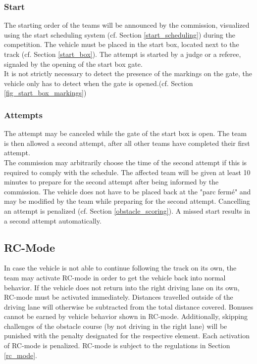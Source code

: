 \subsubsection{Start}

The starting order of the teams will be announced by the commission, visualized
using the start scheduling system (cf. Section \ref{start_scheduling}) during
the competition. The vehicle must be placed in the start box, located next to
the track (cf. Section \ref{start_box}). The attempt is started by a judge or a
referee, signaled by the opening of the start box gate.\\ It is not strictly
necessary to detect the presence of the markings on the gate, the vehicle only
has to detect when the gate is opened.(cf. Section
\ref{fig_start_box_markings})

\subsubsection{Attempts}

The attempt may be canceled while the gate of the start box is open. The team
is then allowed a second attempt, after all other teams have completed their
first attempt.\\ The commission may arbitrarily choose the time of the second
attempt if this is required to comply with the schedule. The affected team will
be given at least 10 minutes to prepare for the second attempt after being
informed by the commission. The vehicle does not have to be placed back at the
"parc fermé" and may be modified by the team while preparing for the second
attempt. Cancelling an attempt is penalized (cf. Section
\ref{obstacle_scoring}). A missed start results in a second attempt
automatically.

\subsection{RC-Mode}

In case the vehicle is not able to continue following the track on its own, the
team may activate RC-mode in order to get the vehicle back into normal
behavior. If the vehicle does not return into the right driving lane on its
own, RC-mode must be activated immediately. Distances travelled outside of the
driving lane will otherwise be subtracted from the total distance covered.
Bonuses cannot be earned by vehicle behavior shown in RC-mode. Additionally,
skipping challenges of the obstacle course (by not driving in the right lane)
will be punished with the penalty designated for the respective element. Each
activation of RC-mode is penalized. RC-mode is subject to the regulations in
Section \ref{rc_mode}.

